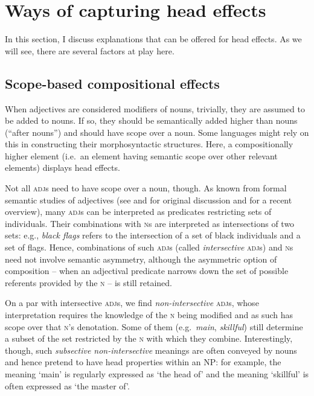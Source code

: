 \documentclass[output=paper
  ,nobabel
  ,draftmode
  ,colorlinks, citecolor=brown
]{langscibook}
\begin{document}
\section{Ways of capturing head effects}\label{sec-headeffects}

In this section, I discuss explanations that can be offered for head effects. As we will see, there are several factors at play here.

\subsection{Scope-based compositional effects}\label{subsec-scopebased}

When adjectives are considered modifiers of nouns, trivially, they are assumed to be added to
nouns. If so, they should be semantically added higher than nouns (``after nouns'') and should have
scope over a noun. Some languages might rely on this in constructing their morphosyntactic
structures. Here, a compositionally higher element (i.e.\ an element having semantic scope over other
relevant elements) displays head effects.

Not all \textsc{adj}s need to have scope over a noun, though. As known from formal semantic studies
of adjectives (see \citet{Kamp1975} and \citet{Siegel1976} for original discussion and
\citet{McNally2016} for a recent overview), many \textsc{adj}s can be interpreted as predicates
restricting sets of individuals. Their combinations with \textsc{n}s are interpreted as
intersections of two sets: e.g., \emph{black flags} refers to the intersection of a set of black
individuals and a set of flags. Hence, combinations of such \textsc{adj}s (called \emph{intersective}
\textsc{adj}s) and \textsc{n}s need not involve semantic asymmetry, although the asymmetric option of
composition – when an adjectival predicate narrows down the set of possible referents provided by
the \textsc{n} – is still retained. 

On a par with intersective \textsc{adj}s, we find \emph{non-intersective} \textsc{adj}s, whose
interpretation requires the knowledge of the \textsc{n} being modified and as such has scope over
that \textsc{n}'s denotation. Some of them (e.g.\ \emph{main}, \emph{skillful}) still determine a subset of
the set restricted by the \textsc{n} with which they combine. Interestingly, though, such \emph{subsective
non-intersective} meanings are often conveyed by nouns and hence pretend to have head properties
within an NP: for example, the meaning `main' is regularly expressed as `the head of' and the
meaning `skillful' is often expressed as `the master of'. 
\end{document}
